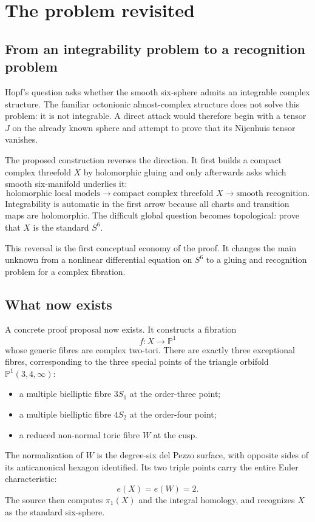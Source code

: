 \documentclass[11pt,reqno]{amsart}
\numberwithin{equation}{section}
\newcommand{\Pone}{\mathbb P^1}
\theoremstyle{definition}
\begin{document}
\section{The problem revisited}\label{sec:problem}

\subsection{From an integrability problem to a recognition problem}

Hopf's question asks whether the smooth six-sphere admits an integrable complex structure. The familiar octonionic almost-complex structure does not solve this problem: it is not integrable. A direct attack would therefore begin with a tensor $J$ on the already known sphere and attempt to prove that its Nijenhuis tensor vanishes.

The proposed construction reverses the direction. It first builds a compact complex threefold $X$ by holomorphic gluing and only afterwards asks which smooth six-manifold underlies it:
\[
\text{holomorphic local models}
\longrightarrow
\text{compact complex threefold }X
\longrightarrow
\text{smooth recognition}.
\]
Integrability is automatic in the first arrow because all charts and transition maps are holomorphic. The difficult global question becomes topological: prove that $X$ is the standard $S^6$.

This reversal is the first conceptual economy of the proof. It changes the main unknown from a nonlinear differential equation on $S^6$ to a gluing and recognition problem for a complex fibration.

\subsection{What now exists}

A concrete proof proposal now exists. It constructs a fibration
\[
 f:X\longrightarrow \Pone
\]
whose generic fibres are complex two-tori. There are exactly three exceptional fibres, corresponding to the three special points of the triangle orbifold $\Pone(3,4,\infty)$:
\begin{itemize}
\item a multiple bielliptic fibre $3S_1$ at the order-three point;
\item a multiple bielliptic fibre $4S_2$ at the order-four point;
\item a reduced non-normal toric fibre $W$ at the cusp.
\end{itemize}
The normalization of $W$ is the degree-six del Pezzo surface, with opposite sides of its anticanonical hexagon identified. Its two triple points carry the entire Euler characteristic:
\[
 e(X)=e(W)=2.
\]
The source then computes $\pi_1(X)$ and the integral homology, and recognizes $X$ as the standard six-sphere.
\end{document}
